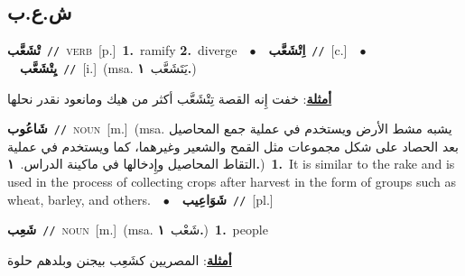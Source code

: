 \documentclass[10pt,a4paper,twoside]{article} %
\begin{document}
\begin{multicols}{2}
\vspace{-3mm}
\subsection*{\color{blue}\foreignlanguage{arabic}{ش.ع.ب}\color{blue}{}} 

{\setlength\topsep{0pt}\textbf{\foreignlanguage{arabic}{تْشَعَّب}}\ {\color{gray}\texttt{//}\color{black}}\ \textsc{verb}\ [p.]\ \textbf{1.}~ramify  \textbf{2.}~diverge\ \ $\bullet$\ \ \setlength\topsep{0pt}\textbf{\foreignlanguage{arabic}{اِتْشَعَّب}}\ {\color{gray}\texttt{//}\color{black}}\ [c.]\ \ $\bullet$\ \ \setlength\topsep{0pt}\textbf{\foreignlanguage{arabic}{يِتْشَعَّب}}\ {\color{gray}\texttt{//}\color{black}}\ [i.]\ \color{gray}(msa. \foreignlanguage{arabic}{يَتَشَعَّب}~\foreignlanguage{arabic}{\textbf{١.}})\color{black}\  \begin{flushright}\color{gray}\foreignlanguage{arabic}{\textbf{\underline{\foreignlanguage{arabic}{أمثلة}}}: خفت إِنه القصة تِتْشَعَّب أكثر من هيك ومانعود نقدر نحلها}\end{flushright}\color{black}} \vspace{2mm}

{\setlength\topsep{0pt}\textbf{\foreignlanguage{arabic}{شَاعُوب}}\ {\color{gray}\texttt{//}\color{black}}\ \textsc{noun}\ [m.]\ \color{gray}(msa. \foreignlanguage{arabic}{يشبه مشط الأرض ويستخدم في عملية جمع المحاصيل بعد الحصاد على شكل مجموعات مثل القمح والشعير وغيرهما، كما ويستخدم في عملية التقاط المحاصيل وإِدخالها في ماكينة الدراس.}~\foreignlanguage{arabic}{\textbf{١.}})\color{black}\ \textbf{1.}~It is similar to the rake and is used in the process of collecting crops after harvest in the form of groups such as wheat, barley, and others.\ \ $\bullet$\ \ \setlength\topsep{0pt}\textbf{\foreignlanguage{arabic}{شَوَاعِيب}}\ {\color{gray}\texttt{//}\color{black}}\ [pl.]\ } \vspace{2mm}

{\setlength\topsep{0pt}\textbf{\foreignlanguage{arabic}{شَعِب}}\ {\color{gray}\texttt{//}\color{black}}\ \textsc{noun}\ [m.]\ \color{gray}(msa. \foreignlanguage{arabic}{شَعْب}~\foreignlanguage{arabic}{\textbf{١.}})\color{black}\ \textbf{1.}~people\  \begin{flushright}\color{gray}\foreignlanguage{arabic}{\textbf{\underline{\foreignlanguage{arabic}{أمثلة}}}: المصريين كشَعِب بيجنن وبلدهم حلوة}\end{flushright}\color{black}} \vspace{2mm}


\end{multicols}
\end{document}
